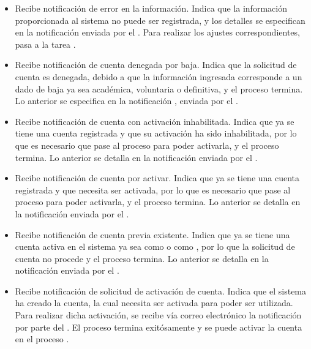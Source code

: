 \begin{PDescripcion}
\begin{enumerate}
	\begin{itemize}
	  \item Recibe notificación de error en la información. Indica que la información proporcionada al sistema no puede ser registrada, y los detalles se especifican en la notificación  enviada por el . Para realizar los ajustes correspondientes, pasa a la tarea .
	  \item Recibe notificación de cuenta denegada por baja. Indica que la solicitud de cuenta es denegada, debido a que la información ingresada corresponde a un  dado de baja ya sea académica, voluntaria o definitiva, y el proceso termina. Lo anterior se especifica en la notificación , enviada por el .
	  \item Recibe notificación de cuenta con activación inhabilitada. Indica que ya se tiene una cuenta registrada y que su activación ha sido inhabilitada, por lo que es necesario que pase al proceso  para poder activarla, y el proceso termina. Lo anterior se detalla en la notificación  enviada por el .
	  \item Recibe notificación de cuenta por activar. Indica que ya se tiene una cuenta registrada y que necesita ser activada, por lo que es necesario que pase al proceso  para poder activarla, y el proceso termina. Lo anterior se detalla en la notificación  enviada por el .
	  \item Recibe notificación de cuenta previa existente. Indica que ya se tiene una cuenta activa en el sistema ya sea como  o como , por lo que la solicitud de cuenta no procede y el proceso termina. Lo anterior se detalla en la notificación  enviada por el .
	  \item Recibe notificación de solicitud de activación de cuenta. Indica que el sistema ha creado la cuenta, la cual necesita ser activada para poder ser utilizada. Para realizar dicha activación, se recibe vía correo electrónico la notificación  por parte del . El proceso termina exitósamente y se puede activar la cuenta en el proceso .
	\end{itemize}


\end{enumerate}
\end{PDescripcion}
